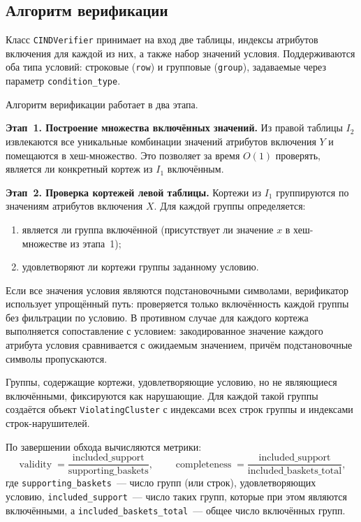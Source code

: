 \subsection{Алгоритм верификации}

Класс \texttt{CINDVerifier} принимает на вход две таблицы, индексы атрибутов включения для каждой из них, а также набор значений условия. Поддерживаются оба типа условий: строковые (\texttt{row}) и групповые (\texttt{group}), задаваемые через параметр \texttt{condition\_type}.

Алгоритм верификации работает в два этапа.

\textbf{Этап~1. Построение множества включённых значений.} Из правой таблицы $I_2$ извлекаются все уникальные комбинации значений атрибутов включения $Y$ и помещаются в хеш-множество. Это позволяет за время $O(1)$ проверять, является ли конкретный кортеж из $I_1$ включённым.

\textbf{Этап~2. Проверка кортежей левой таблицы.} Кортежи из $I_1$ группируются по значениям атрибутов включения $X$. Для каждой группы определяется:
\begin{enumerate}
    \item является ли группа включённой (присутствует ли значение $x$ в хеш-множестве из этапа~1);
    \item удовлетворяют ли кортежи группы заданному условию.
\end{enumerate}

Если все значения условия являются подстановочными символами, верификатор использует упрощённый путь: проверяется только включённость каждой группы без фильтрации по условию. В противном случае для каждого кортежа выполняется сопоставление с условием: закодированное значение каждого атрибута условия сравнивается с ожидаемым значением, причём подстановочные символы пропускаются.

Группы, содержащие кортежи, удовлетворяющие условию, но не являющиеся включёнными, фиксируются как нарушающие. Для каждой такой группы создаётся объект \texttt{ViolatingCluster} с индексами всех строк группы и индексами строк-нарушителей.

По завершении обхода вычисляются метрики:
\[
\operatorname{validity} = \frac{\text{included\_support}}{\text{supporting\_baskets}}, \qquad
\operatorname{completeness} = \frac{\text{included\_support}}{\text{included\_baskets\_total}},
\]
где \texttt{supporting\_baskets}~--- число групп (или строк), удовлетворяющих условию, \texttt{included\_support}~--- число таких групп, которые при этом являются включёнными, а \texttt{included\_baskets\_total}~--- общее число включённых групп.

